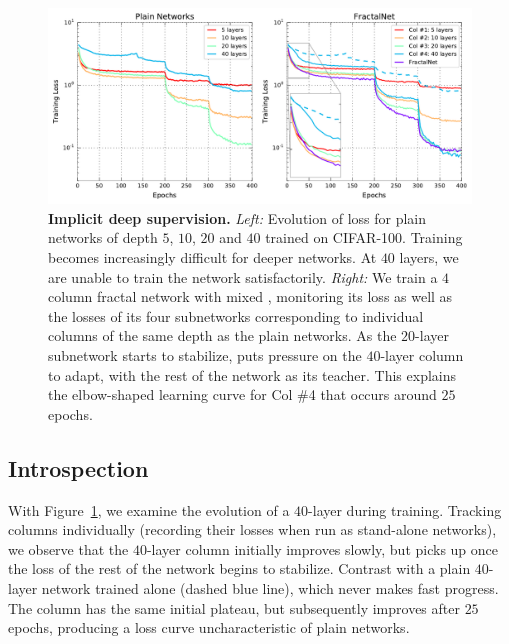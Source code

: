 \begin{figure}
   \begin{center}
      \includegraphics[width=1.0\linewidth]{figures/fractalnet-loss.pdf}
   \end{center}
   \vspace{-0.4cm}
   \caption{
      \textbf{Implicit deep supervision.}
      \emph{Left:}
         Evolution of loss for plain networks of depth $5$, $10$, $20$ and
         $40$ trained on CIFAR-100.  Training becomes increasingly difficult
         for deeper networks.  At $40$ layers, we are unable to train the
         network satisfactorily.
      \emph{Right:}
         We train a $4$ column fractal network with mixed \droppath{},
         monitoring its loss as well as the losses of its four subnetworks
         corresponding to individual columns of the same depth as the plain
         networks.  As the $20$-layer subnetwork starts to stabilize,
         \droppath{} puts pressure on the $40$-layer column to adapt, with the
         rest of the network as its teacher.  This explains the elbow-shaped
         learning curve for Col \#4 that occurs around $25$ epochs.
   }
\label{fig:fractalnet-loss}
\end{figure}

\subsection{Introspection}
\label{sec:introspection}

With Figure~\ref{fig:fractalnet-loss}, we examine the evolution of a $40$-layer
{\fracnet} during training.  Tracking columns individually (recording their
losses when run as stand-alone networks), we observe that the $40$-layer column
initially improves slowly, but picks up once the loss of the rest of the
network begins to stabilize.  Contrast with a plain $40$-layer network trained
alone (dashed blue line), which never makes fast progress.  The column has the
same initial plateau, but subsequently improves after $25$ epochs, producing a
loss curve uncharacteristic of plain networks.

